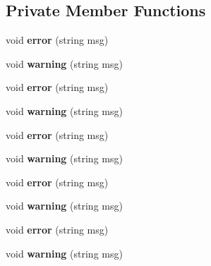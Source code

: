 \subsection*{Private Member Functions}
\begin{DoxyCompactItemize}
\item 
\hypertarget{classSymTab_aac2487968008aeee1b1e2490092c6b8b}{void {\bfseries error} (string msg)}\label{classSymTab_aac2487968008aeee1b1e2490092c6b8b}

\item 
\hypertarget{classSymTab_ae92d574f1857924058d55b69cb146af3}{void {\bfseries warning} (string msg)}\label{classSymTab_ae92d574f1857924058d55b69cb146af3}

\item 
\hypertarget{classSymTab_aac2487968008aeee1b1e2490092c6b8b}{void {\bfseries error} (string msg)}\label{classSymTab_aac2487968008aeee1b1e2490092c6b8b}

\item 
\hypertarget{classSymTab_ae92d574f1857924058d55b69cb146af3}{void {\bfseries warning} (string msg)}\label{classSymTab_ae92d574f1857924058d55b69cb146af3}

\item 
\hypertarget{classSymTab_aac2487968008aeee1b1e2490092c6b8b}{void {\bfseries error} (string msg)}\label{classSymTab_aac2487968008aeee1b1e2490092c6b8b}

\item 
\hypertarget{classSymTab_ae92d574f1857924058d55b69cb146af3}{void {\bfseries warning} (string msg)}\label{classSymTab_ae92d574f1857924058d55b69cb146af3}

\item 
\hypertarget{classSymTab_aac2487968008aeee1b1e2490092c6b8b}{void {\bfseries error} (string msg)}\label{classSymTab_aac2487968008aeee1b1e2490092c6b8b}

\item 
\hypertarget{classSymTab_ae92d574f1857924058d55b69cb146af3}{void {\bfseries warning} (string msg)}\label{classSymTab_ae92d574f1857924058d55b69cb146af3}

\item 
\hypertarget{classSymTab_aac2487968008aeee1b1e2490092c6b8b}{void {\bfseries error} (string msg)}\label{classSymTab_aac2487968008aeee1b1e2490092c6b8b}

\item 
\hypertarget{classSymTab_ae92d574f1857924058d55b69cb146af3}{void {\bfseries warning} (string msg)}\label{classSymTab_ae92d574f1857924058d55b69cb146af3}


\end{DoxyCompactItemize}
